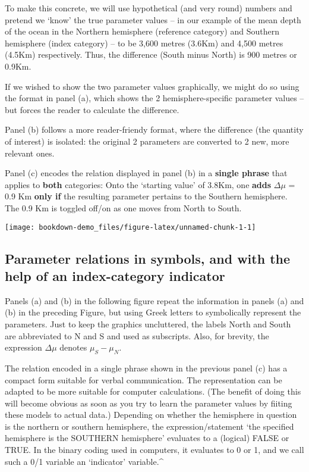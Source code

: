 \documentclass[]{book}
\begin{document}
To make this concrete, we will use hypothetical (and very round) numbers and pretend we `know' the true parameter values -- in our example
of the mean depth of the ocean in the Northern hemisphere (reference category) and Southern hemisphere (index category) -- to be 3,600 metres (3.6Km) and 4,500 metres (4.5Km) respectively. Thus, the difference (South minus North) is 900 metres or 0.9Km.

If we wished to show the two parameter values graphically, we might do so using the format in panel (a), which shows the 2 hemisphere-specific parameter values -- but forces the reader to calculate the difference.

Panel (b) follows a more reader-friendy format, where the difference (the quantity of interest) is isolated: the original 2 parameters are converted to 2 new, more relevant ones.

Panel (c) encodes the relation displayed in panel (b) in a \textbf{single phrase} that applies to \textbf{both} categories: Onto the `starting value' of 3.8Km, one \textbf{adds} \(\Delta \mu\) = 0.9 Km \textbf{only if} the resulting parameter pertains to the Southern hemisphere. The 0.9 Km is toggled off/on as one moves from North to South.

\begin{center}\texttt{[image: bookdown-demo\_files/figure-latex/unnamed-chunk-1-1]} \end{center}

\hypertarget{parameter-relations-in-symbols-and-with-the-help-of-an-index-category-indicator}{%
\subsection{Parameter relations in symbols, and with the help of an index-category indicator}\label{parameter-relations-in-symbols-and-with-the-help-of-an-index-category-indicator}}

Panels (a) and (b) in the following figure repeat the information in panels (a) and (b) in the preceding Figure, but using Greek letters to symbolically represent the parameters. Just to keep the graphics uncluttered, the labels North and South are abbreviated to N and S and used as subscripts. Also, for brevity, the expression \(\Delta \mu\) denotes \(\mu_S - \mu_N\).

The relation encoded in a single phrase shown in the previous panel (c) has a compact form suitable for verbal communication. The representation can be adapted to be more suitable for computer calculations. (The benefit of doing this will become obvious as soon as you try to learn the parameter values by fiiting these models to actual data.) Depending on whether the hemisphere in question is the northern or southern hemisphere, the expression/statement `the specified hemisphere is the SOUTHERN hemisphere' evaluates to a (logical) FALSE or TRUE. In the binary coding used in computers, it evaluates to 0 or 1, and we call such a 0/1 variable an `indicator' variable.\^{}
\end{document}
